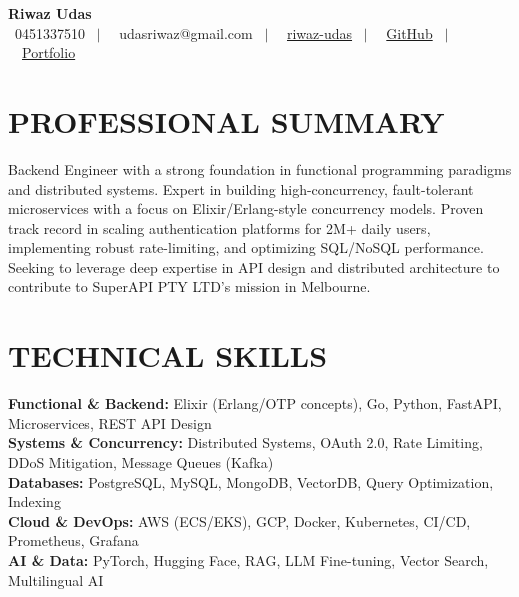 \documentclass[letterpaper,11pt]{article}
\begin{document}
\begin{center}
    \textbf{\Huge Riwaz Udas} \\ \vspace{4pt}
    \scriptsize
    \faPhone* \ 0451337510 \ $|$ \
    \faEnvelope \ udasriwaz@gmail.com \ $|$ \
    \faLinkedin \ \href{https://www.linkedin.com/in/riwaz-udas-7aab521b1/}{riwaz-udas} \ $|$ \
    \faGithub \ \href{https://github.com/riwazudas}{GitHub} \ $|$ \
    \faGlobe \ \href{https://portfolio-website-496606.web.app}{Portfolio}
\end{center}

\section{PROFESSIONAL SUMMARY}
\begin{itemize}[leftmargin=0in, label={}]
\small{\item{
Backend Engineer with a strong foundation in functional programming paradigms and distributed systems. Expert in building high-concurrency, fault-tolerant microservices with a focus on Elixir/Erlang-style concurrency models. Proven track record in scaling authentication platforms for 2M+ daily users, implementing robust rate-limiting, and optimizing SQL/NoSQL performance. Seeking to leverage deep expertise in API design and distributed architecture to contribute to SuperAPI PTY LTD’s mission in Melbourne.
}}
\end{itemize}

\section{TECHNICAL SKILLS}
\begin{itemize}[leftmargin=0in, label={}]
\small{\item{
\textbf{Functional \& Backend:} Elixir (Erlang/OTP concepts), Go, Python, FastAPI, Microservices, REST API Design \\
\textbf{Systems \& Concurrency:} Distributed Systems, OAuth 2.0, Rate Limiting, DDoS Mitigation, Message Queues (Kafka) \\
\textbf{Databases:} PostgreSQL, MySQL, MongoDB, VectorDB, Query Optimization, Indexing \\
\textbf{Cloud \& DevOps:} AWS (ECS/EKS), GCP, Docker, Kubernetes, CI/CD, Prometheus, Grafana \\
\textbf{AI \& Data:} PyTorch, Hugging Face, RAG, LLM Fine-tuning, Vector Search, Multilingual AI
}}
\end{itemize}
\end{document}
